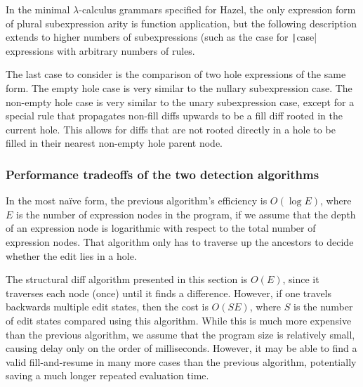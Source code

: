 In the minimal $\lambda$-calculus grammars specified for Hazel, the only expression form of plural subexpression arity is function application, but the following description extends to higher numbers of subexpressions (such as the case for \texttt|case| expressions with arbitrary numbers of rules.

The last case to consider is the comparison of two hole expressions of the same form. The empty hole case is very similar to the nullary subexpression case. The non-empty hole case is very similar to the unary subexpression case, except for a special rule that propagates non-fill diffs upwards to be a fill diff rooted in the current hole. This allows for diffs that are not rooted directly in a hole to be filled in their nearest non-empty hole parent node.

\begin{singlespace}
\end{singlespace}


\subsubsection{Performance tradeoffs of the two detection algorithms}
\label{sec:far-detect-compare}

In the most na\"ive form, the previous algorithm's efficiency is $O(\log E)$, where $E$ is the number of expression nodes in the program, if we assume that the depth of an expression node is logarithmic with respect to the total number of expression nodes. That algorithm only has to traverse up the ancestors to decide whether the edit lies in a hole.

The structural diff algorithm presented in this section is $O(E)$, since it traverses each node (once) until it finds a difference. However, if one travels backwards multiple edit states, then the cost is $O(SE)$, where $S$ is the number of edit states compared using this algorithm. While this is much more expensive than the previous algorithm, we assume that the program size is relatively small, causing delay only on the order of milliseconds. However, it may be able to find a valid fill-and-resume in many more cases than the previous algorithm, potentially saving a much longer repeated evaluation time.

